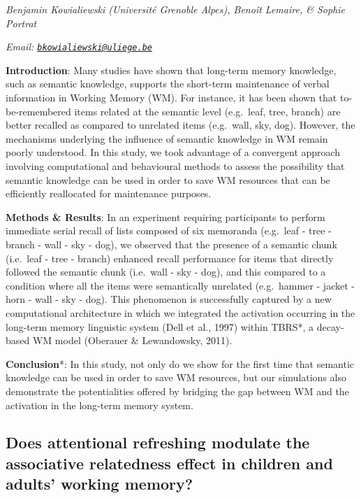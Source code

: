 \documentclass[12pt,]{book}
\begin{document}
\emph{Benjamin Kowialiewski (Université Grenoble Alpes), Benoît Lemaire, \& Sophie Portrat}

\emph{Email: \href{mailto:bkowialiewski@uliege.be}{\nolinkurl{bkowialiewski@uliege.be}}}

\textbf{Introduction}: Many studies have shown that long-term memory knowledge, such as semantic knowledge, supports the short-term maintenance of verbal information in Working Memory (WM). For instance, it has been shown that to-be-remembered items related at the semantic level (e.g.~leaf, tree, branch) are better recalled as compared to unrelated items (e.g.~wall, sky, dog). However, the mechanisms underlying the influence of semantic knowledge in WM remain poorly understood. In this study, we took advantage of a convergent approach involving computational and behavioural methods to assess the possibility that semantic knowledge can be used in order to save WM resources that can be efficiently reallocated for maintenance purposes.

\textbf{Methods \& Results}: In an experiment requiring participants to perform immediate serial recall of lists composed of six memoranda (e.g.~leaf - tree - branch - wall - sky - dog), we observed that the presence of a semantic chunk (i.e.~leaf - tree - branch) enhanced recall performance for items that directly followed the semantic chunk (i.e.~wall - sky - dog), and this compared to a condition where all the items were semantically unrelated (e.g.~hammer - jacket - horn - wall - sky - dog). This phenomenon is successfully captured by a new computational architecture in which we integrated the activation occurring in the long-term memory linguistic system (Dell et al., 1997) within TBRS*, a decay-based WM model (Oberauer \& Lewandowsky, 2011).

\textbf{Conclusion}*: In this study, not only do we show for the first time that semantic knowledge can be used in order to save WM resources, but our simulations also demonstrate the potentialities offered by bridging the gap between WM and the activation in the long-term memory system.

\hypertarget{does-attentional-refreshing-modulate-the-associative-relatedness-effect-in-children-and-adults-working-memory}{%
\subsection{Does attentional refreshing modulate the associative relatedness effect in children and adults' working memory?}\label{does-attentional-refreshing-modulate-the-associative-relatedness-effect-in-children-and-adults-working-memory}}
\end{document}
